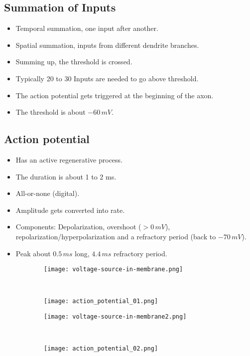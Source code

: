 \documentclass[main]{subfiles}
\begin{document}
\subsection{Summation of Inputs}
\begin{itemize}[noitemsep,nolistsep]
	\item Temporal summation, one input after another.
	\item Spatial summation, inputs from different dendrite branches.
	\item Summing up, the threshold is crossed.
	\item Typically 20 to 30 Inputs are needed to go above threshold.
	\item The action potential gets triggered at the beginning of the axon.
	\item The threshold is about $-60\,mV$.
\end{itemize}

\subsection{Action potential}
\begin{itemize}[noitemsep,nolistsep]
	\item Has an active regenerative process.
	\item The duration is about 1 to 2 ms.
	\item All-or-none (digital).
	\item Amplitude gets converted into rate.
	\item Components: Depolarization, overshoot ($>0\,mV$), repolarization/hyperpolarization and a refractory period (back to $-70\,mV$).
	\item Peak about $0.5\,ms$ long, $4.4\,ms$ refractory period.
\end{itemize}
\begin{figure}[H]
	\centering
	\begin{subfigure}[b]{0.5\textwidth}
		\centering
		\texttt{[image: voltage-source-in-membrane.png]}
	\end{subfigure}%
	~
	\begin{subfigure}[b]{0.5\textwidth}
		\centering
		\texttt{[image: action\_potential\_01.png]}
	\end{subfigure}
\end{figure}
\begin{figure}[H]
	\centering
	\begin{subfigure}[b]{0.5\textwidth}
		\centering
		\texttt{[image: voltage-source-in-membrane2.png]}
	\end{subfigure}%
	~
	\begin{subfigure}[b]{0.5\textwidth}
		\centering
		\texttt{[image: action\_potential\_02.png]}
	\end{subfigure}
\end{figure}
\end{document}
